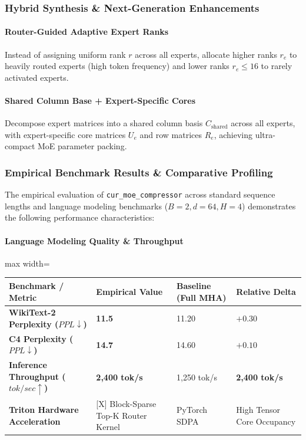 \subsubsection*{Hybrid Synthesis \& Next-Generation Enhancements}

\paragraph{Router-Guided Adaptive Expert Ranks}
Instead of assigning uniform rank $r$ across all experts, allocate higher ranks $r_e$ to heavily routed experts (high token frequency) and lower ranks $r_e \le 16$ to rarely activated experts.

\paragraph{Shared Column Base + Expert-Specific Cores}
Decompose expert matrices into a shared column basis $C_{\text{shared}}$ across all experts, with expert-specific core matrices $U_e$ and row matrices $R_e$, achieving ultra-compact MoE parameter packing.

\subsubsection*{Empirical Benchmark Results \& Comparative Profiling}

The empirical evaluation of \texttt{cur\_moe\_compressor} across standard sequence lengths and language modeling benchmarks ($B=2, d=64, H=4$) demonstrates the following performance characteristics:

\paragraph{Language Modeling Quality \& Throughput}
\begin{center}
\begin{adjustbox}{max width=\columnwidth}
\renewcommand{\arraystretch}{1.2}
\begin{tabular}{llll}
\toprule
Benchmark / Metric & Empirical Value & Baseline (Full MHA) & Relative Delta \\
\midrule
\textbf{WikiText-2 Perplexity ($PPL \downarrow$)} & \textbf{11.5} & 11.20 & $+0.30$ \\
\textbf{C4 Perplexity ($PPL \downarrow$)} & \textbf{14.7} & 14.60 & $+0.10$ \\
\textbf{Inference Throughput ($tok/sec \uparrow$)} & \textbf{2,400 tok/s} & 1,250 tok/s & \textbf{2,400 tok/s} \\
\textbf{Triton Hardware Acceleration} & [X] Block-Sparse Top-K Router Kernel & PyTorch SDPA & High Tensor Core Occupancy \\

\bottomrule
\end{tabular}
\end{adjustbox}
\end{center}
